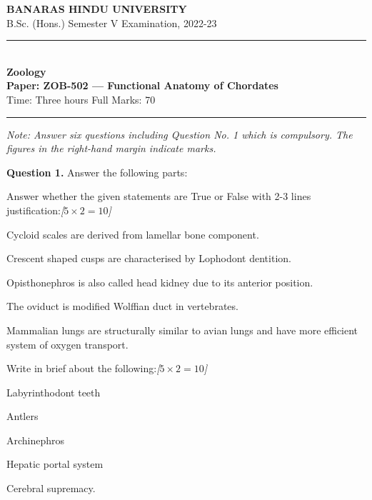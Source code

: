 \documentclass[11pt,a4paper]{article}
\newcommand{\pts}[1]{\hfill   \textit{[#1]}}
\begin{document}
\begin{center}
  {\large\bfseries BANARAS HINDU UNIVERSITY}\\[2pt]
  {\normalsize B.Sc. (Hons.) Semester V Examination, 2022-23}\\[6pt]
  \rule{0.8\linewidth}{0.5pt}\\[6pt]
  {\large\bfseries Zoology}\\[4pt]
  {\large\bfseries Paper: ZOB-502 --- Functional Anatomy of Chordates}\\[4pt]
  {\normalsize Time: Three hours \hfill Full Marks: 70}
\end{center}

\rule{\linewidth}{0.4pt}

\smallskip



\noindent   \textit{Note: Answer six questions including Question No. 1 which is compulsory. The figures in the right-hand margin indicate marks.}

\bigskip




\noindent   \textbf{Question 1.} Answer the following parts:

\begin{parts}
  \item Answer whether the given statements are True or False with 2-3 lines justification:\pts{$5  \times 2 = 10$}
  
\begin{parts}
    \item Cycloid scales are derived from lamellar bone component.
    \item Crescent shaped cusps are characterised by Lophodont dentition.
    \item Opisthonephros is also called head kidney due to its anterior position.
    \item The oviduct is modified Wolffian duct in vertebrates.
    \item Mammalian lungs are structurally similar to avian lungs and have more efficient system of oxygen transport.
  \end{parts}
  
  \item Write in brief about the following:\pts{$5  \times 2 = 10$}
  
\begin{parts}
    \item Labyrinthodont teeth
    \item Antlers
    \item Archinephros
    \item Hepatic portal system
    \item Cerebral supremacy.
  \end{parts}
\end{parts}
\end{document}
